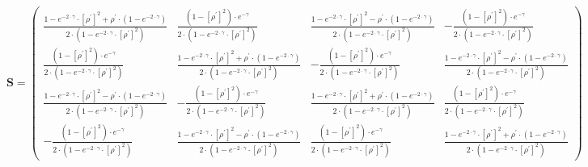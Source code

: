 \[ \mathbf{S} = \left(\begin{smallmatrix} \frac{ 1 - e^{-2 \cdot
\gamma }  \cdot \left[ \rho^\prime \right]^2 + \rho^\prime \cdot
\left( 1 - e^{-2 \cdot \gamma }  \right) }{ 2 \cdot \left( 1 - e^{-2
\cdot \gamma }  \cdot \left[ \rho^\prime \right]^2 \right) }  & \frac{
\left( 1 - \left[ \rho^\prime \right]^2 \right) \cdot e^{-\gamma }  }{
2 \cdot \left( 1 - e^{-2 \cdot \gamma }  \cdot \left[ \rho^\prime
\right]^2 \right) }  & \frac{ 1 - e^{-2 \cdot \gamma }  \cdot \left[
\rho^\prime \right]^2 - \rho^\prime \cdot \left( 1 - e^{-2 \cdot
\gamma }  \right)  }{ 2 \cdot \left( 1 - e^{-2 \cdot \gamma }  \cdot
\left[ \rho^\prime \right]^2 \right) }  & -\frac{ \left( 1 - \left[
\rho^\prime \right]^2 \right) \cdot e^{-\gamma }  }{ 2 \cdot \left( 1
- e^{-2 \cdot \gamma }  \cdot \left[ \rho^\prime \right]^2 \right) }
\\ \frac{ \left( 1 - \left[ \rho^\prime \right]^2 \right) \cdot
e^{-\gamma }  }{ 2 \cdot \left( 1 - e^{-2 \cdot \gamma }  \cdot \left[
\rho^\prime \right]^2 \right) }  & \frac{ 1 - e^{-2 \cdot \gamma }
\cdot \left[ \rho^\prime \right]^2 + \rho^\prime \cdot \left( 1 -
e^{-2 \cdot \gamma }  \right) }{ 2 \cdot \left( 1 - e^{-2 \cdot \gamma
}  \cdot \left[ \rho^\prime \right]^2 \right) }  & -\frac{ \left( 1 -
\left[ \rho^\prime \right]^2 \right) \cdot e^{-\gamma }  }{ 2 \cdot
\left( 1 - e^{-2 \cdot \gamma }  \cdot \left[ \rho^\prime \right]^2
\right) }  & \frac{ 1 - e^{-2 \cdot \gamma }  \cdot \left[ \rho^\prime
\right]^2 - \rho^\prime \cdot \left( 1 - e^{-2 \cdot \gamma }  \right)
}{ 2 \cdot \left( 1 - e^{-2 \cdot \gamma }  \cdot \left[ \rho^\prime
\right]^2 \right) }  \\ \frac{ 1 - e^{-2 \cdot \gamma }  \cdot \left[
\rho^\prime \right]^2 - \rho^\prime \cdot \left( 1 - e^{-2 \cdot
\gamma }  \right)  }{ 2 \cdot \left( 1 - e^{-2 \cdot \gamma }  \cdot
\left[ \rho^\prime \right]^2 \right) }  & -\frac{ \left( 1 - \left[
\rho^\prime \right]^2 \right) \cdot e^{-\gamma }  }{ 2 \cdot \left( 1
- e^{-2 \cdot \gamma }  \cdot \left[ \rho^\prime \right]^2 \right) }
& \frac{ 1 - e^{-2 \cdot \gamma }  \cdot \left[ \rho^\prime \right]^2
+ \rho^\prime \cdot \left( 1 - e^{-2 \cdot \gamma }  \right) }{ 2
\cdot \left( 1 - e^{-2 \cdot \gamma }  \cdot \left[ \rho^\prime
\right]^2 \right) }  & \frac{ \left( 1 - \left[ \rho^\prime \right]^2
\right) \cdot e^{-\gamma }  }{ 2 \cdot \left( 1 - e^{-2 \cdot \gamma }
\cdot \left[ \rho^\prime \right]^2 \right) }  \\ -\frac{ \left( 1 -
\left[ \rho^\prime \right]^2 \right) \cdot e^{-\gamma }  }{ 2 \cdot
\left( 1 - e^{-2 \cdot \gamma }  \cdot \left[ \rho^\prime \right]^2
\right) }  & \frac{ 1 - e^{-2 \cdot \gamma }  \cdot \left[ \rho^\prime
\right]^2 - \rho^\prime \cdot \left( 1 - e^{-2 \cdot \gamma }  \right)
}{ 2 \cdot \left( 1 - e^{-2 \cdot \gamma }  \cdot \left[ \rho^\prime
\right]^2 \right) }  & \frac{ \left( 1 - \left[ \rho^\prime \right]^2
\right) \cdot e^{-\gamma }  }{ 2 \cdot \left( 1 - e^{-2 \cdot \gamma }
\cdot \left[ \rho^\prime \right]^2 \right) }  & \frac{ 1 - e^{-2 \cdot
\gamma }  \cdot \left[ \rho^\prime \right]^2 + \rho^\prime \cdot
\left( 1 - e^{-2 \cdot \gamma }  \right) }{ 2 \cdot \left( 1 - e^{-2
\cdot \gamma }  \cdot \left[ \rho^\prime \right]^2 \right) }
\end{smallmatrix}\right) \]
